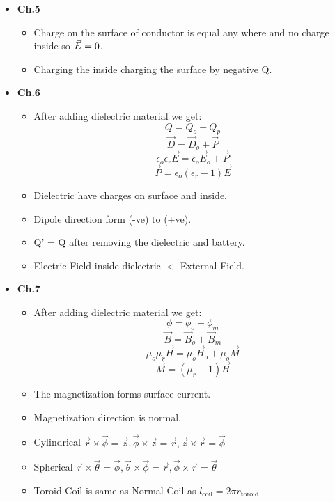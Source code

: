 \documentclass[10pt,landscape]{article}
\begin{document}
\begin{multicols*}{3}
\begin{itemize}
\begin{itemize}
    \end{itemize}
    \item \textbf{Ch.5}
    \begin{itemize}
                \item Charge on the surface of conductor is equal any where and no charge inside so $\vec{E}_{\title{inside}} = 0$.
                \item Charging the inside charging the surface by negative Q.
    \end{itemize}
    \item \textbf{Ch.6}
    \begin{itemize}
                \item After adding dielectric material we get:
                $$ Q = Q_o + Q_p $$
                $$ \vec{D} = \vec{D}_o + \vec{P} $$
                $$ \epsilon_o \epsilon_r \vec{E} = \epsilon_o \vec{E}_o + \vec{P} $$
                $$ \vec{P} = \epsilon_o (\epsilon_r - 1)  \vec{E}  $$
                \item Dielectric have charges on surface and inside.
                \item Dipole direction form (-ve) to (+ve).
                \item Q' = Q after removing the dielectric and battery.
                \item Electric Field inside dielectric $<$ External Field.
    \end{itemize}
    \item \textbf{Ch.7}
    \begin{itemize}
                \item After adding dielectric material we get:
                $$ \phi = \phi_o + \phi_m $$
                $$ \vec{B} = \vec{B}_o + \vec{B}_m $$
                $$ \mu_o \mu_r \vec{H} = \mu_o \vec{H}_o + \mu_o \vec{M} $$
                $$ \vec{M} = (\mu_r - 1)  \vec{H} $$
                \item The magnetization forms surface current.
                \item Magnetization direction is normal.
                \item Cylindrical $ \vec{r} \times \vec{\phi} = \vec{z}, \vec{\phi} \times \vec{z} = \vec{r}, \vec{z} \times \vec{r} = \vec{\phi}$
                \item Spherical $ \vec{r} \times \vec{\theta} = \vec{\phi}, \vec{\theta} \times \vec{\phi} = \vec{r}, \vec{\phi} \times \vec{r} = \vec{\theta}$
                \item Toroid Coil is same as Normal Coil as $l_{\text{coil}} = 2 \pi r_{\text{toroid}}$

\end{itemize}
\end{itemize}
\end{multicols*}
\end{document}
